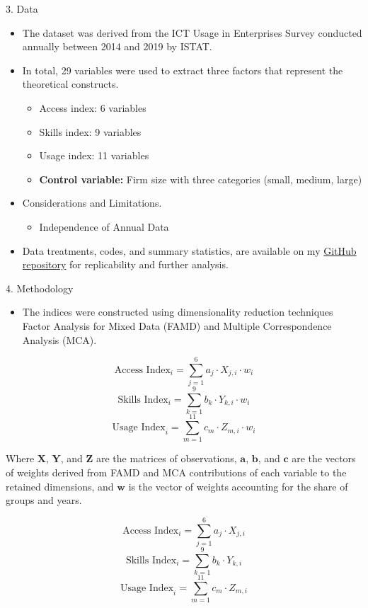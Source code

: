 \documentclass[
  ignorenonframetext,
]{beamer}
\providecommand{\tightlist}{%
  \setlength{\itemsep}{0pt}\setlength{\parskip}{0pt}}
\begin{document}
\begin{frame}{3. Data}
\label{data}
\begin{itemize}
\item
  The dataset was derived from the ICT Usage in Enterprises Survey
  conducted annually between 2014 and 2019 by ISTAT.
\item
  In total, 29 variables were used to extract three factors that
  represent the theoretical constructs.

  \begin{itemize}
  \tightlist
  \item
    Access index: 6 variables
  \item
    Skills index: 9 variables
  \item
    Usage index: 11 variables
  \item
    \textbf{Control variable:} Firm size with three categories (small,
    medium, large)
  \end{itemize}
\item
  Considerations and Limitations.

  \begin{itemize}
  \tightlist
  \item
    Independence of Annual Data
  \end{itemize}
\item
  Data treatments, codes, and summary statistics, are available on my
  \href{https://github.com/luchocastillo84/Factor_Analysis_Digital_Divide/tree/main}{GitHub
  repository} for replicability and further analysis.
\end{itemize}
\end{frame}

\begin{frame}{4. Methodology}
\label{methodology}
\begin{itemize}
\tightlist
\item
  The indices were constructed using dimensionality reduction techniques
  Factor Analysis for Mixed Data (FAMD) and Multiple Correspondence
  Analysis (MCA).
\end{itemize}

\[ \text{Access Index}_i = \sum_{j=1}^{6} a_j \cdot X_{j,i} \cdot w_i \]
\[ \text{Skills Index}_i = \sum_{k=1}^{9} b_k \cdot Y_{k,i} \cdot w_i \]
\[ \text{Usage Index}_i = \sum_{m=1}^{11} c_m \cdot Z_{m,i} \cdot w_i \]

Where \(\mathbf{X}\), \(\mathbf{Y}\), and \(\mathbf{Z}\) are the
matrices of observations, \(\mathbf{a}\), \(\mathbf{b}\), and
\(\mathbf{c}\) are the vectors of weights derived from FAMD and MCA
contributions of each variable to the retained dimensions, and
\(\mathbf{w}\) is the vector of weights accounting for the share of
groups and years.

\[ \text{Access Index}_i = \sum_{j=1}^{6} a_j \cdot X_{j,i} \]
\[ \text{Skills Index}_i = \sum_{k=1}^{9} b_k \cdot Y_{k,i} \]
\[ \text{Usage Index}_i = \sum_{m=1}^{11} c_m \cdot Z_{m,i} \]
\end{frame}
\end{document}

